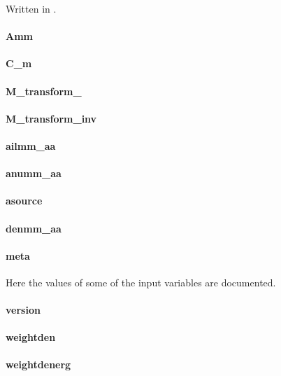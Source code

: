 Written in .

\paragraph{Amm}

\paragraph{C\_m}

\paragraph{M\_transform\_}

\paragraph{M\_transform\_inv}

\paragraph{ailmm\_aa}

\paragraph{anumm\_aa}

\paragraph{asource}

\paragraph{denmm\_aa}

\paragraph{meta}
Here the values of some of the input variables are documented.

\paragraph{version}

\paragraph{weightden}

\paragraph{weightdenerg}

